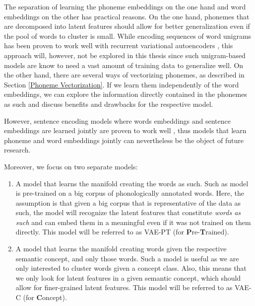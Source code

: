 \documentclass[6pt]{article}
\begin{document}
The separation of learning the phoneme embeddings on the one hand and word embeddings on the other has practical reasons. On the one hand, phonemes that are decomposed into latent features should allow for better generalization even if the pool of words to cluster is small. While encoding sequences of word unigrams has been proven to work well with recurrent variational autoencoders \citep{bowman2015generating}, this approach will, however, not be explored in this thesis since such unigram-based models are know to need a vast amount of training data to generalize well. On the other hand, there are several ways of vectorizing phonemes, as described in Section \ref{Phoneme Vectorization}. If we learn them independently of the word embeddings, we can explore the information directly contained in the phonemes as such and discuss benefits and drawbacks for the respective model.

However, sentence encoding models where words embeddings and sentence embeddings are learned jointly are proven to work well \cite{kiros2015skip}, thus models that learn phoneme and word embeddings jointly can nevertheless be the object of future research.


Moreover, we focus on two separate models:
\begin{enumerate}
\item A model that learns the manifold creating the words as such. Such as model is pre-trained on a big corpus of phonologically annotated words. Here, the assumption is that given a big corpus that is representative of the data as such, the model will recognize the latent features that constitute \textit{words as such} and can embed them in a meaningful even if it was not trained on them directly. This model will be referred to as VAE-PT (for \textbf{P}re-\textbf{T}rained).
\item A model that learns the manifold creating words given the respective semantic concept, and only those words. Such a model is useful as we are only interested to cluster words given a concept class. Also, this means that we only look for latent features in a given semantic concept, which should allow for finer-grained latent features. This model will be referred to as VAE-C (for \textbf{C}oncept).
\end{enumerate}
\end{document}
